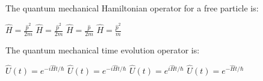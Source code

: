 \begin{question}[2]
The quantum mechanical Hamiltonian operator for a free particle is:

\begin{oneparcheckboxes}
\choice $\displaystyle \hat{H} = \frac{\hat{p}^2}{2m}$
\correctchoice $\displaystyle \hat{H} = \frac{\hat{p}^2}{2m}$
\choice $\displaystyle \hat{H} = \frac{\hat{p}}{2m}$
\choice $\displaystyle \hat{H} = \frac{\hat{p}^2}{m}$
\end{oneparcheckboxes}
\end{question}

\begin{question}[2]
The quantum mechanical time evolution operator is:

\begin{oneparcheckboxes}
\choice $\displaystyle \hat{U}(t) = e^{-i\hat{H}t/\hbar}$
\correctchoice $\displaystyle \hat{U}(t) = e^{-i\hat{H}t/\hbar}$
\choice $\displaystyle \hat{U}(t) = e^{i\hat{H}t/\hbar}$
\choice $\displaystyle \hat{U}(t) = e^{-\hat{H}t/\hbar}$
\end{oneparcheckboxes}
\end{question} 